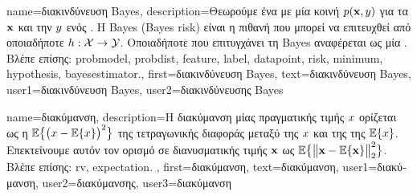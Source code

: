 {name={\foreignlanguage{greek}{διακινδύνευση} Bayes},
	description={\foreignlanguage{greek}{Θεωρούμε ένα}  \foreignlanguage{greek}{με μία κοινή}  
		$p({\bf x},y)$ \foreignlanguage{greek}{για τα}  ${\bf x}$ 
		\foreignlanguage{greek}{και την}  $y$ \foreignlanguage{greek}{ενός} . 
		\foreignlanguage{greek}{Η} 
		 Bayes (Bayes risk) \foreignlanguage{greek}{είναι η}  \foreignlanguage{greek}{πιθανή} 
		 \foreignlanguage{greek}{που μπορεί να επιτευχθεί από οποιαδήποτε}  
		$h: \mathcal{X} \rightarrow \mathcal{Y}$. \foreignlanguage{greek}{Οποιαδήποτε}  \foreignlanguage{greek}{που 
		επιτυγχάνει τη}  Bayes \foreignlanguage{greek}{αναφέρεται ως μία}  \cite{LC}.\\
		\foreignlanguage{greek}{Βλέπε επίσης:} \gls{probmodel}, \gls{probdist}, \gls{feature}, \gls{label}, \gls{datapoint}, \gls{risk}, \gls{minimum}, 
		\gls{hypothesis}, \gls{bayesestimator}.},
	first={\foreignlanguage{greek}{διακινδύνευση} Bayes},
	text={\foreignlanguage{greek}{διακινδύνευση} Bayes},
	user1={\foreignlanguage{greek}{διακινδύνευση} Bayes}, %
	user2={\foreignlanguage{greek}{διακινδύνευσης} Bayes} %
}

{name={\foreignlanguage{greek}{διακύμανση}},
	description={\foreignlanguage{greek}{Η διακύμανση μίας} 
		 \foreignlanguage{greek}{πραγματικής τιμής $x$ ορίζεται ως η}  
		$\mathbb{E}\big\{ \big( x - \mathbb{E}\{x \} \big)^{2} \big\}$ \foreignlanguage{greek}{της τετραγωνικής διαφοράς μεταξύ της $x$ 
		και της}  \foreignlanguage{greek}{της $\mathbb{E}\{x \}$. Επεκτείνουμε αυτόν τον ορισμό σε}  
		\foreignlanguage{greek}{διανυσματικής τιμής ${\bf x}$ 
		ως} $\mathbb{E}\big\{ \big\| {\bf x} - \mathbb{E}\{{\bf x} \} \big\|_{2}^{2} \big\}$.\\
		\foreignlanguage{greek}{Βλέπε επίσης:} \gls{rv}, \gls{expectation}.} ,
	first={\foreignlanguage{greek}{διακύμανση}},
	text={\foreignlanguage{greek}{διακύμανση}},
	user1={\foreignlanguage{greek}{διακύμανση}}, %
   	user2={\foreignlanguage{greek}{διακύμανσης}}, %
	user3={\foreignlanguage{greek}{διακύμανση}} %
}

